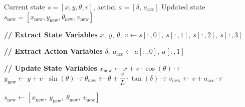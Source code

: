 \documentclass[nonacm,sigconf]{acmart}
\begin{document}
\begin{algorithm}[h]
\caption{Dynamics of Bicycle Model}
\label{alg:bicycle_dynamics}
\begin{algorithmic}[1]
\Require Current state $s = [x, y, \theta, v]$,
         action $a = [\delta,\, a_{\text{acc}}]$
\Ensure  Updated state
         $s_{\text{new}} =
         [x_{\text{new}}, y_{\text{new}}, \theta_{\text{new}}, v_{\text{new}}]$

\State \textbf{// Extract State Variables}
\State $x,\ y,\ \theta,\ v
       \gets s[:,0],\ s[:,1],\ s[:,2],\ s[:,3]$

\State \textbf{// Extract Action Variables}
\State $\delta,\ a_{\text{acc}} \gets a[:,0],\ a[:,1]$

\State \textbf{// Update State Variables}
\State $x_{\text{new}}      \gets x      + v \cdot \cos(\theta) \cdot \tau$
\State $y_{\text{new}}      \gets y      + v \cdot \sin(\theta) \cdot \tau$
\State $\theta_{\text{new}} \gets \theta + \dfrac{v}{L} \cdot \tan(\delta) \cdot \tau$
\State $v_{\text{new}}      \gets v      + a_{\text{acc}} \cdot \tau$

\State \Return
       $s_{\text{new}} \gets
       [x_{\text{new}},\ y_{\text{new}},\
        \theta_{\text{new}},\ v_{\text{new}}]$
\end{algorithmic}
\end{algorithm}










\end{document}
